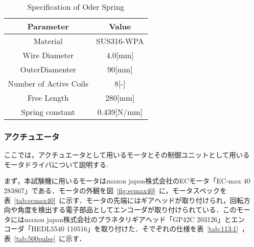 \documentclass[a4paper,12pt]{article_vdlab_sotsuron}
\begin{document}
  \begin{table}[h!]
    \begin{center}
      \makeatletter
      \def\@captype{table}
      \makeatother
      \caption{Specification of Oder Spring}
        \label{tab:spring}
  	\begin{tabular}{cc}\hline
  	  Parameter & Value\\\hline
  	  Material & SUS316-WPA\\
  	  Wire Diameter  & 4.0[mm]\\
  	  OuterDiamenter & 90[mm]\\
  	  Number of Active Coils & 8[-]\\
  	  Free Length & 280[mm]\\
      Spring constant & 0.439[N/mm]\\\hline
        \end{tabular}
      \end{center}
  \end{table}
\newpage
\subsubsection{アクチュエータ}
ここでは，アクチュエータとして用いるモータとその制御ユニットとして用いるモータドライバについて説明する.
\par
まず，本試験機に用いるモータはmaxon japan株式会社のECモータ「EC-max 40 283867」である．モータの外観を図~\ref{fig:ecmax40}~に，モータスペックを表~\ref{tab:ecmax40}~に示す．モータの先端にはギアヘッドが取り付けられ，回転方向や角度を検出する電子部品としてエンコーダが取り付けられている．このモータにはmaxon japan株式会社のプラネタリギアヘッド「GP42C 203126」とエンコーダ「HEDL5540 110516」を取り付けた．そでぞれの仕様を表~\ref{tab:113:1}~，表~\ref{tab:500pulse}~に示す．
\end{document}
